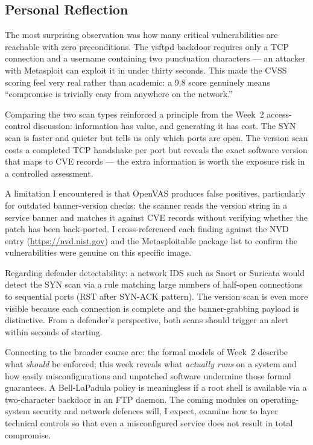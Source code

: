 \documentclass[11pt,a4paper]{article}
\begin{document}
\subsection{Personal Reflection}

The most surprising observation was how many critical vulnerabilities are reachable with
zero preconditions.  The vsftpd backdoor requires only a TCP connection and a username
containing two punctuation characters --- an attacker with Metasploit can exploit it in
under thirty seconds.  This made the CVSS scoring feel very real rather than academic:
a 9.8 score genuinely means ``compromise is trivially easy from anywhere on the network.''

Comparing the two scan types reinforced a principle from the Week~2 access-control
discussion: information has value, and generating it has cost.  The SYN scan is faster
and quieter but tells us only which ports are open.  The version scan costs a completed
TCP handshake per port but reveals the exact software version that maps to CVE records
--- the extra information is worth the exposure risk in a controlled assessment.

A limitation I encountered is that OpenVAS produces false positives, particularly for
outdated banner-version checks: the scanner reads the version string in a service banner
and matches it against CVE records without verifying whether the patch has been
back-ported.  I cross-referenced each finding against the NVD entry
(\url{https://nvd.nist.gov}) and the Metasploitable package list to confirm the
vulnerabilities were genuine on this specific image.

Regarding defender detectability: a network IDS such as Snort or Suricata would detect
the SYN scan via a rule matching large numbers of half-open connections to sequential
ports (RST after SYN-ACK pattern).  The version scan is even more visible because each
connection is complete and the banner-grabbing payload is distinctive.  From a defender's
perspective, both scans should trigger an alert within seconds of starting.

Connecting to the broader course arc: the formal models of Week~2 describe what
\emph{should} be enforced; this week reveals what \emph{actually runs} on a system and
how easily misconfigurations and unpatched software undermine those formal guarantees.
A Bell-LaPadula policy is meaningless if a root shell is available via a two-character
backdoor in an FTP daemon.  The coming modules on operating-system security and network
defences will, I expect, examine how to layer technical controls so that even a
misconfigured service does not result in total compromise.
\end{document}
